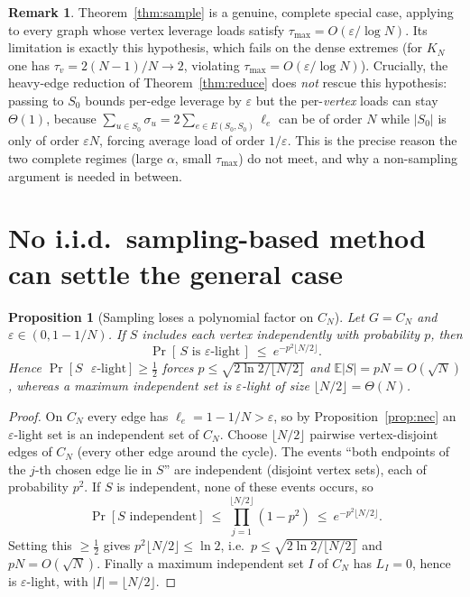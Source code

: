 \documentclass[12pt]{article}
\newcommand{\eps}{\varepsilon}
\newtheorem{proposition}{Proposition}
\theoremstyle{definition}
\newtheorem{remark}{Remark}
\begin{document}
\begin{remark}
Theorem~\ref{thm:sample} is a genuine, complete special case, applying to every
graph whose vertex leverage loads satisfy $\tau_{\max}=O(\eps/\log N)$. Its
limitation is exactly this hypothesis, which fails on the dense extremes (for
$K_N$ one has $\tau_v=2(N-1)/N\to2$, violating $\tau_{\max}=O(\eps/\log N)$).
Crucially, the heavy-edge reduction of Theorem~\ref{thm:reduce} does \emph{not}
rescue this hypothesis: passing to $S_0$ bounds per-edge leverage by $\eps$ but
the per-\emph{vertex} loads can stay $\Theta(1)$, because
$\sum_{u\in S_0}\sigma_u=2\sum_{e\in E(S_0,S_0)}\ell_e$ can be of order $N$ while
$|S_0|$ is only of order $\eps N$, forcing average load of order $1/\eps$. This is
the precise reason the two complete regimes (large $\alpha$, small $\tau_{\max}$)
do not meet, and why a non-sampling argument is needed in between.
\end{remark}

\section{No i.i.d.\ sampling-based method can settle the general case}

\begin{proposition}[Sampling loses a polynomial factor on $C_N$]\label{prop:loglb}
Let $G=C_N$ and $\eps\in(0,1-1/N)$. If $S$ includes each vertex independently
with probability $p$, then
\[
  \Pr[\,S\text{ is $\eps$-light}\,]\ \le\ e^{-p^2\lfloor N/2\rfloor}.
\]
Hence $\Pr[S\text{ $\eps$-light}]\ge\tfrac12$ forces $p\le\sqrt{2\ln2/\lfloor
N/2\rfloor}$ and $\mathbb E|S|=pN=O(\sqrt N)$, whereas a maximum independent set
is $\eps$-light of size $\lfloor N/2\rfloor=\Theta(N)$.
\end{proposition}

\begin{proof}
On $C_N$ every edge has $\ell_e=1-1/N>\eps$, so by Proposition~\ref{prop:nec} an
$\eps$-light set is an independent set of $C_N$. Choose
$\lfloor N/2\rfloor$ pairwise vertex-disjoint edges of $C_N$ (every other edge
around the cycle). The events ``both endpoints of the $j$-th chosen edge lie in
$S$'' are independent (disjoint vertex sets), each of probability $p^2$. If $S$
is independent, none of these events occurs, so
\[
  \Pr[S\text{ independent}]\ \le\ \prod_{j=1}^{\lfloor N/2\rfloor}(1-p^2)
  \ \le\ e^{-p^2\lfloor N/2\rfloor}.
\]
Setting this $\ge\tfrac12$ gives $p^2\lfloor N/2\rfloor\le\ln2$, i.e.\
$p\le\sqrt{2\ln2/\lfloor N/2\rfloor}$ and $pN=O(\sqrt N)$. Finally a maximum
independent set $I$ of $C_N$ has $L_I=0$, hence is $\eps$-light, with
$|I|=\lfloor N/2\rfloor$.
\end{proof}
\end{document}
